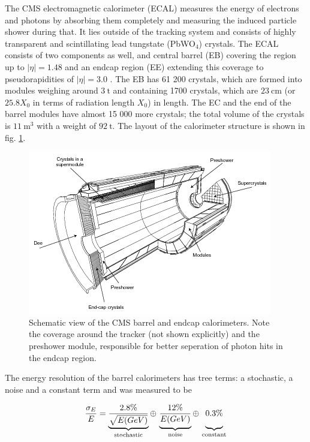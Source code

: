 
The CMS electromagnetic calorimeter (ECAL) measures the energy of electrons and photons by absorbing them completely and measuring the induced particle shower during that. It lies outside of the tracking system and consists of highly transparent and scintillating lead tungstate (PbWO$_4$) crystals. The ECAL consists of two components as well, and central barrel (EB) covering the region up to $|\eta| = 1.48$ and an endcap region (EE) extending this coverage to pseudorapidities of $|\eta| = 3.0$ \cite{Biino_2015}. The EB has 61 200 crystals, which are formed into modules weighing around $\SI{3}{\tonne}$ and containing 1700 crystals, which are $\SI{23}{\centi\meter}$ (or $25.8 X_0$ in terms of radiation length $X_0$) in length. The EC and the end of the barrel modules have almost 15 000 more crystals; the total volume of the crystals is $\SI{11}{\cubic\meter}$ with a weight of $\SI{92}{\tonne}$. The layout of the calorimeter structure is shown in fig. \ref{fig:ecal}.

\begin{figure}[h!]
	\centering
	\includegraphics[width=0.6\linewidth]{figures/theoryexperiment/ecal.png}
	\caption{Schematic view of the CMS barrel and endcap calorimeters. Note the coverage around the tracker (not shown explicitly) and the preshower module, responsible for better seperation of photon hits in the endcap region. \cite{Chatrchyan:1554142}}
	\label{fig:ecal}
\end{figure}

The energy resolution of the barrel calorimeters has tree terms: a stochastic, a noise and a constant term and was measured to be \cite{Chatrchyan:1554142}

\begin{equation*}
	\frac{\sigma_E}{E} = \underbrace{\frac{2.8\%}{\sqrt{E(GeV)}}}_\text{stochastic} \oplus \, \underbrace{\vphantom{\frac{2.8\%}{\sqrt{E(GeV)}}}\frac{12\%}{E(GeV)}}_\text{noise} \oplus \, \underbrace{\vphantom{\frac{2.8\%}{\sqrt{E(GeV)}}}0.3\%}_\text{constant}
\end{equation*}

